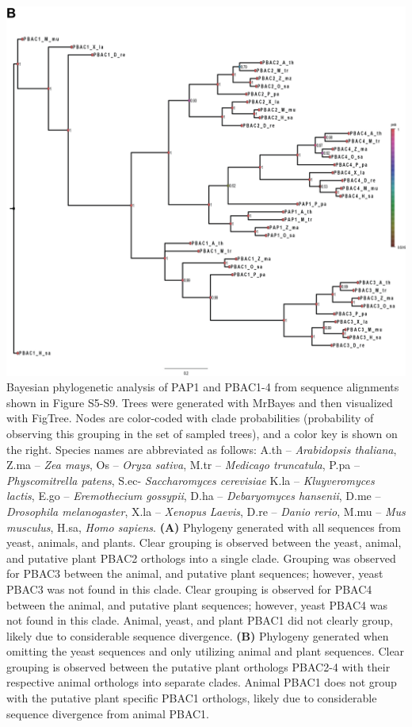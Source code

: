 \begin{FPfigure}
	\ContinuedFloat
	\centering
	\includegraphics[width=\columnwidth]{Proteasome/tree2.png}
	{Bayesian phylogenetic analysis of PAP1 and PBAC1-4 from sequence alignments shown in Figure S5-S9. Trees were generated with MrBayes \citep{ronquist12} and then visualized with FigTree. Nodes are color-coded with clade probabilities (probability of observing this grouping in the set of sampled trees), and a color key is shown on the right. Species names are abbreviated as follows: A.th – \textit{Arabidopsis thaliana}, Z.ma – \textit{Zea mays}, Os – \textit{Oryza sativa}, M.tr – \textit{Medicago truncatula}, P.pa – \textit{Physcomitrella patens}, S.ec- \textit{Saccharomyces cerevisiae} K.la – \textit{Kluyveromyces lactis}, E.go – \textit{Eremothecium gossypii}, D.ha – \textit{Debaryomyces hansenii}, D.me – \textit{Drosophila melanogaster}, X.la – \textit{Xenopus Laevis}, D.re – \textit{Danio rerio}, M.mu – \textit{Mus musculus}, H.sa, \textit{Homo sapiens}. \textbf{(A)} Phylogeny generated with all sequences from yeast, animals, and plants. Clear grouping is observed between the yeast, animal, and putative plant PBAC2 orthologs into a single clade. Grouping was observed for PBAC3 between the animal, and putative plant sequences; however, yeast PBAC3 was not found in this clade. Clear grouping is observed for PBAC4 between the animal, and putative plant sequences; however, yeast PBAC4 was not found in this clade. Animal, yeast, and plant PBAC1 did not clearly group, likely due to considerable sequence divergence. \textbf{(B)} Phylogeny generated when omitting the yeast sequences and only utilizing animal and plant sequences. Clear grouping is observed between the putative plant orthologs PBAC2-4 with their respective animal orthologs into separate clades. Animal PBAC1 does not group with the putative plant specific PBAC1 orthologs, likely due to considerable sequence divergence from animal PBAC1.}
	\label{fig:tree2}
\end{FPfigure}
\FloatBarrier


